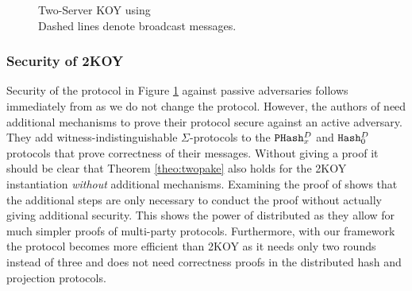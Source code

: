 \begin{figure}[tbhp]
\caption{Two-Server KOY \cite{Katz_MacKenzie_Taban_Gligor_2005} using \SPHFF
\\{\tiny Dashed lines denote broadcast messages.}}
\label{fig:twokoy}
\end{figure}

\subsubsection{Security of 2KOY}
Security of the protocol in Figure \ref{fig:twokoy} against passive adversaries follows immediately from \cite[Theorem 1]{Katz_MacKenzie_Taban_Gligor_2005} as we do not change the protocol.
However, the authors of \cite{Katz_MacKenzie_Taban_Gligor_2005} need additional mechanisms to prove their protocol secure against an active adversary.
They add witness-indistinguishable $\Sigma$-protocols to the $\mathtt{PHash}_x^{D}$ and $\mathtt{Hash}_0^{D}$ protocols that prove correctness of their messages.
Without giving a proof it should be clear that Theorem \ref{theo:twopake} also holds for the 2KOY instantiation \emph{without} additional mechanisms.
Examining the proof of \cite[Theorem 2]{Katz_MacKenzie_Taban_Gligor_2005} shows that the additional steps are only necessary to conduct the proof without actually giving additional security.
This shows the power of distributed \SPHFF as they allow for much simpler proofs of multi-party protocols.
Furthermore, with our framework the protocol becomes more efficient than 2KOY as it needs only two rounds instead of three and does not need correctness proofs in the distributed hash and projection protocols.
